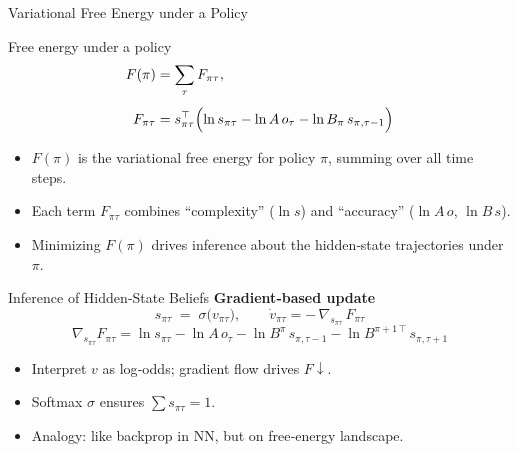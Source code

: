\documentclass[aspectratio=1610, english]{beamer}
\begin{document}
\begin{frame}{Variational Free Energy under a Policy}
\begin{block}{Free energy under a policy}
    \[
    \begin{aligned}
        F(\pi) &= \sum_{\tau} F_{\pi\tau}, \\[4pt]
        F_{\pi\tau}
        &= 
        s_{\pi\tau}^\top
        \Bigl(\ln s_{\pi\tau} - \ln A\,o_\tau - \ln B_\pi\,s_{\pi,\tau-1}\Bigr)
    \end{aligned}
    \]
\end{block}
\begin{itemize}
  \item \(F(\pi)\) is the variational free energy for policy \(\pi\), summing over all time steps.  
  \item Each term \(F_{\pi\tau}\) combines “complexity” (\(\ln s\)) and “accuracy” (\(\ln A\,o\), \(\ln B\,s\)).  
  \item Minimizing \(F(\pi)\) drives inference about the hidden‐state trajectories under \(\pi\).  
\end{itemize}
\end{frame}

\begin{frame}{Inference of Hidden‐State Beliefs}
    \textbf{Gradient‐based update}
    \[
      s_{\pi\tau} \;=\;\sigma\bigl(v_{\pi\tau}\bigr), 
      \qquad
      \dot v_{\pi\tau}
      = -\,\nabla_{s_{\pi\tau}}\,F_{\pi\tau}
    \]
    \[
      \nabla_{s_{\pi\tau}}F_{\pi\tau}
      = \ln s_{\pi\tau}
        - \ln A\,o_{\tau}
        - \ln B^{\pi}\,s_{\pi,\tau-1}
        - \ln B^{\pi+1\,\top}\,s_{\pi,\tau+1}
    \]
    \begin{itemize}
      \item Interpret \(v\) as log‑odds; gradient flow drives \(F\downarrow\).  
      \item Softmax \(\sigma\) ensures \(\sum s_{\pi\tau}=1\).  
      \item Analogy: like backprop in NN, but on free‑energy landscape.  
    \end{itemize}
\end{frame}
\end{document}
